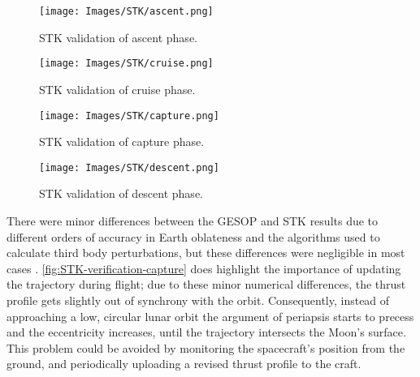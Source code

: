 \begin{figure}
\centering
\texttt{[image: Images/STK/ascent.png]}
\caption{STK validation of ascent phase.} \label{fig:STK-verification-ascent}
\end{figure}


\begin{figure}
\centering
\texttt{[image: Images/STK/cruise.png]}
\caption{STK validation of cruise phase.} \label{fig:STK-verification-cruise}
\end{figure}


\begin{figure}
\centering
\texttt{[image: Images/STK/capture.png]}
\caption{STK validation of capture phase.} \label{fig:STK-verification-capture}
\end{figure}


\begin{figure}
\centering
\texttt{[image: Images/STK/descent.png]}
\caption{STK validation of descent phase.} \label{fig:STK-verification-descent}
\end{figure}

There were minor differences %
between the GESOP and STK results due to different orders of accuracy in Earth oblateness and the algorithms used to calculate third body perturbations, but these differences were negligible in most cases%
. \autoref{fig:STK-verification-capture} does highlight the importance of updating the trajectory during flight; due to these minor numerical differences, the thrust profile gets slightly out of synchrony with the orbit. Consequently, instead of approaching a low, circular lunar orbit the argument of periapsis starts to precess and the eccentricity increases, until the trajectory intersects the Moon's surface. This problem could be avoided by monitoring the spacecraft's position from the ground, and periodically uploading a revised thrust profile to the craft.

%

